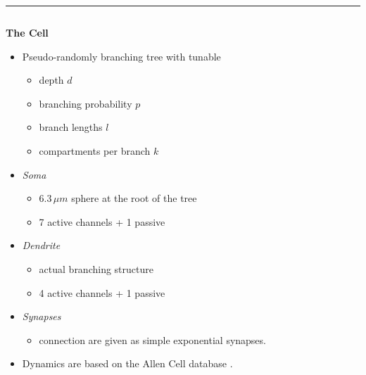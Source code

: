 \documentclass{beamer}
\begin{document}
\begin{frame}[t, fragile]
  \vspace*{1ex}
  \textcolor{arbred}{\rule{\textwidth}{0.5ex}}
  \vspace*{-1ex}
  \begin{columns}[t]
    \begin{column}[T]{0.25\textwidth}
      \textbf{The Cell}
      \begin{itemize}
        \item Pseudo-randomly branching tree with tunable
        \begin{itemize}
          \item depth $d$
          \item branching probability $p$
          \item branch lengths $l$
          \item compartments per branch $k$
        \end{itemize}
        \item \emph{Soma}
        \begin{itemize}
          \item $6.3\,\mu m$ sphere at the root of the tree
          \item 7 active channels + 1 passive
        \end{itemize}
        \item \emph{Dendrite}
        \begin{itemize}
          \item actual branching structure
          \item 4 active channels + 1 passive
        \end{itemize}
        \item \emph{Synapses}
        \begin{itemize}
          \item connection are given as simple exponential
                synapses.
        \end{itemize}
        \item Dynamics are based on the Allen Cell database \cite{allen-v1}.
      \end{itemize}
    \end{column}
    \begin{column}[T]{0.45\textwidth}
      \centering
\end{column}
\end{columns}
\end{frame}
\end{document}
